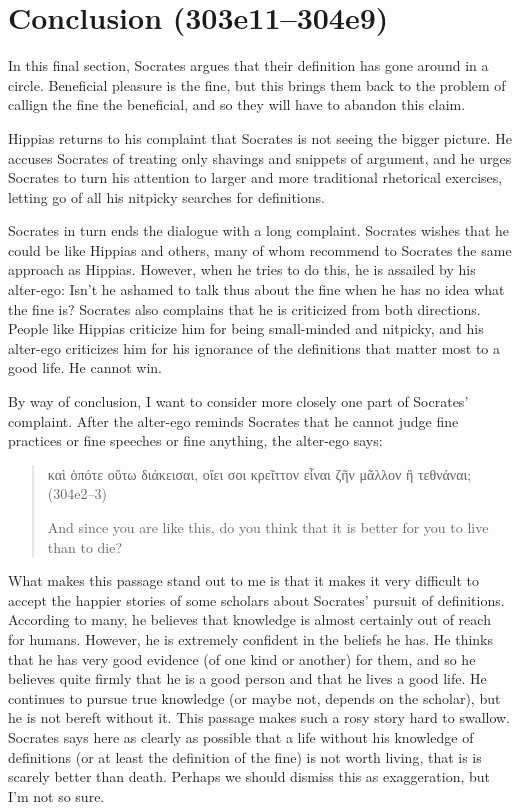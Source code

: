 \documentclass[12pt]{article}
\begin{document}
\section{Conclusion (303e11--304e9)}

In this final section, Socrates argues that their definition has gone around in a circle.  Beneficial pleasure is the fine, but this brings them back to the problem of callign the fine the beneficial, and so they will have to abandon this claim.

Hippias returns to his complaint that Socrates is not seeing the bigger picture.  He accuses Socrates of treating only shavings and snippets of argument, and he urges Socrates to turn his attention to larger and more traditional rhetorical exercises, letting go of all his nitpicky searches for definitions.

Socrates in turn ends the dialogue with a long complaint.  Socrates wishes that he could be like Hippias and others, many of whom recommend to Socrates the same approach as Hippias.  However, when he tries to do this, he is assailed by his alter-ego: Isn't he ashamed to talk thus about the fine when he has no idea what the fine is?  Socrates also complains that he is criticized from both directions.  People like Hippias criticize him for being small-minded and nitpicky, and his alter-ego criticizes him for his ignorance of the definitions that matter most to a good life.  He cannot win.

By way of conclusion, I want to consider more closely one part of Socrates' complaint.  After the alter-ego reminds Socrates that he cannot judge fine practices or fine speeches or fine anything, the alter-ego says:

\begin{quote}
    {\g καὶ ὁπότε οὕτω διάκεισαι, οἴει σοι κρεῖττον εἶναι ζῆν μᾶλλον ἢ τεθνάναι;} (304e2--3)

    And since you are like this, do you think that it is better for you to live than to die?
\end{quote}

What makes this passage stand out to me is that it makes it very difficult to accept the happier stories of some scholars about Socrates' pursuit of definitions.  According to many, he believes that knowledge is almost certainly out of reach for humans.  However, he is extremely confident in the beliefs he has.  He thinks that he has very good evidence (of one kind or another) for them, and so he believes quite firmly that he is a good person and that he lives a good life.  He continues to pursue true knowledge (or maybe not, depends on the scholar), but he is not bereft without it.  This passage makes such a rosy story hard to swallow.  Socrates says here as clearly as possible that a life without his knowledge of definitions (or at least the definition of the fine) is not worth living, that is is scarely better than death.  Perhaps we should dismiss this as exaggeration, but I'm not so sure.



\newpage


\end{document}
